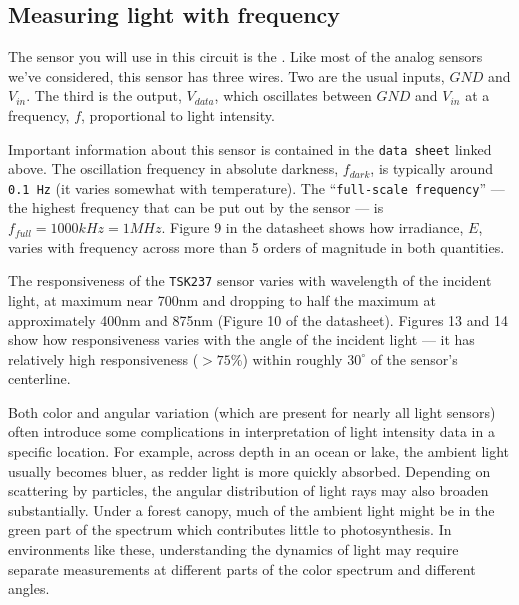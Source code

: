 \subsection{Measuring light with frequency}
The sensor you will use in this circuit is the .
Like most of the analog sensors we've considered, this sensor has three wires.
Two are the usual inputs, $GND$ and $V_{in}$. 
The third is the output, $V_{data}$, which oscillates between $GND$ and $V_{in}$ at a frequency, $f$, proportional to light intensity.

Important information about this sensor is contained in the \texttt{data sheet} linked above.
The oscillation frequency in absolute darkness, $f_{dark}$, is typically around \texttt{0.1 Hz} (it varies somewhat with temperature).
The ``\texttt{full-scale frequency}'' --- the highest frequency that can be put out by the sensor --- is $f_{full}=1000kHz=1MHz$.
Figure 9 in the datasheet shows how irradiance, $E$, varies with frequency across more than 5 orders of magnitude in both quantities.

The responsiveness of the \texttt{TSK237} sensor varies with wavelength of the incident light, at maximum near 700nm and dropping to half the maximum at approximately 400nm and 875nm (Figure 10 of the datasheet).
Figures 13 and 14 show how responsiveness varies with the angle of the incident light --- it has relatively high responsiveness ($>75\%$) within roughly $30^\circ$ of the sensor's centerline.

Both color and angular variation (which are present for nearly all light sensors) often introduce some complications in interpretation of light intensity data in a specific location.
For example, across depth in an ocean or lake, the ambient light usually becomes bluer, as redder light is more quickly absorbed.
Depending on scattering by particles, the angular distribution of light rays may also broaden substantially.
Under a forest canopy, much of the ambient light might be in the green part of the spectrum which contributes little to photosynthesis.
In environments like these, understanding the dynamics of light may require separate measurements at different parts of the color spectrum and different angles.

